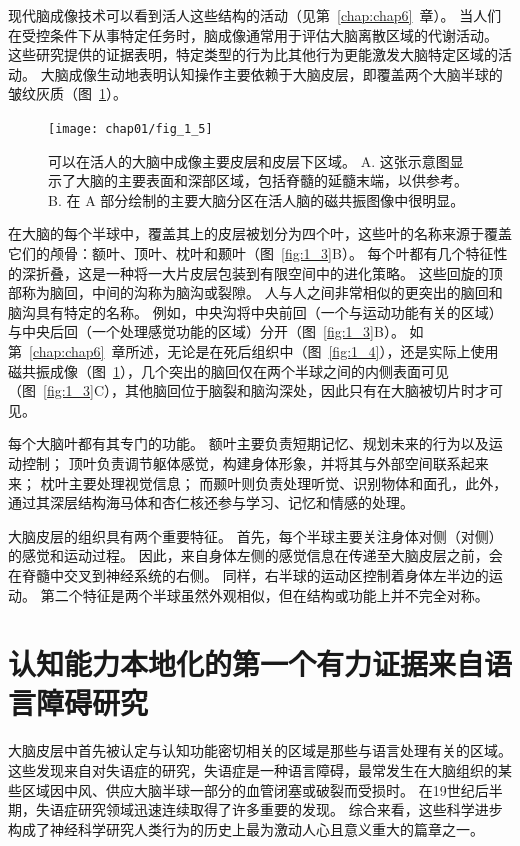 现代脑成像技术可以看到活人这些结构的活动（见第~\ref{chap:chap6}~章）。
当人们在受控条件下从事特定任务时，脑成像通常用于评估大脑离散区域的代谢活动。
这些研究提供的证据表明，特定类型的行为比其他行为更能激发大脑特定区域的活动。
大脑成像生动地表明认知操作主要依赖于大脑皮层，即覆盖两个大脑半球的皱纹灰质（图~\ref{fig:1_5}）。


\begin{figure}[htbp]
	\centering
	\texttt{[image: chap01/fig\_1\_5]}
	\caption{可以在活人的大脑中成像主要皮层和皮层下区域。
		A. 这张示意图显示了大脑的主要表面和深部区域，包括脊髓的延髓末端，以供参考。
		B. 在 A 部分绘制的主要大脑分区在活人脑的磁共振图像中很明显。}
	\label{fig:1_5}
\end{figure}


在大脑的每个半球中，覆盖其上的皮层被划分为四个叶，这些叶的名称来源于覆盖它们的颅骨：额叶、顶叶、枕叶和颞叶（图~\ref{fig:1_3}B）。
每个叶都有几个特征性的深折叠，这是一种将一大片皮层包装到有限空间中的进化策略。
这些回旋的顶部称为脑回，中间的沟称为脑沟或裂隙。 
人与人之间非常相似的更突出的脑回和脑沟具有特定的名称。
例如，中央沟将中央前回（一个与运动功能有关的区域）与中央后回（一个处理感觉功能的区域）分开（图~\ref{fig:1_3}B）。
如第~\ref{chap:chap6}~章所述，无论是在死后组织中（图~\ref{fig:1_4}），还是实际上使用磁共振成像（图~\ref{fig:1_5}），几个突出的脑回仅在两个半球之间的内侧表面可见（图~\ref{fig:1_3}C），其他脑回位于脑裂和脑沟深处，因此只有在大脑被切片时才可见。


每个大脑叶都有其专门的功能。
额叶主要负责短期记忆、规划未来的行为以及运动控制；
顶叶负责调节躯体感觉，构建身体形象，并将其与外部空间联系起来来；
枕叶主要处理视觉信息；
而颞叶则负责处理听觉、识别物体和面孔，此外，通过其深层结构海马体和杏仁核还参与学习、记忆和情感的处理。


大脑皮层的组织具有两个重要特征。
首先，每个半球主要关注身体对侧（对侧）的感觉和运动过程。
因此，来自身体左侧的感觉信息在传递至大脑皮层之前，会在脊髓中交叉到神经系统的右侧。
同样，右半球的运动区控制着身体左半边的运动。
第二个特征是两个半球虽然外观相似，但在结构或功能上并不完全对称。



\section{认知能力本地化的第一个有力证据来自语言障碍研究}


大脑皮层中首先被认定与认知功能密切相关的区域是那些与语言处理有关的区域。
这些发现来自对失语症的研究，失语症是一种语言障碍，最常发生在大脑组织的某些区域因中风、供应大脑半球一部分的血管闭塞或破裂而受损时。
在19世纪后半期，失语症研究领域迅速连续取得了许多重要的发现。
综合来看，这些科学进步构成了神经科学研究人类行为的历史上最为激动人心且意义重大的篇章之一。


